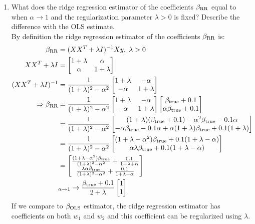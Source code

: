 \documentclass[12pt,twoside]{article}
\begin{document}
\begin{enumerate}
\begin{enumerate}
  \item What does the ridge regression estimator of the coefficients $\beta_{\operatorname{RR}}$ equal to when $\alpha \rightarrow 1$ and the regularization parameter $\lambda >0$ is fixed? Describe the difference with the OLS estimate.\\
 
  \medskip
  By definition the ridge regression estimator of the coefficients $\beta_{\operatorname{RR}}$ is:
 \begin{align*}
 	\beta_{\operatorname{RR}}				&=	(X X^T + \lambda I)^{-1}	X y	, \; \lambda > 0	\\
	X X^T + \lambda I			&=	\begin{bmatrix} 1+ \lambda & \alpha \\ \alpha  &1+ \lambda \end{bmatrix} \\
	(X X^T + \lambda I)^{-1}		&=	\frac{1}{(1 + \lambda)^2 - \alpha^2} \begin{bmatrix} 1+ \lambda & -\alpha \\ -\alpha & 1+ \lambda \end{bmatrix} \\	
	\Rightarrow \beta_{\operatorname{RR}}	&=	\frac{1}{(1 + \lambda)^2 - \alpha^2} \begin{bmatrix} 1+ \lambda & -\alpha \\ -\alpha & 1+ \lambda \end{bmatrix} \begin{bmatrix} \beta_{\operatorname{true}} + 0.1 \\ \alpha \beta_{\operatorname{true}} + 0.1 \end{bmatrix} \\
							&=	\frac{1}{(1 + \lambda)^2 - \alpha^2}  \begin{bmatrix} (1+ \lambda) (\beta_{\operatorname{true}} + 0.1) -\alpha^2  \beta_{\operatorname{true}} -0.1 \alpha \\
																-\alpha \beta_{\operatorname{true}}  -0.1 \alpha + \alpha (1+\lambda) \beta_{\operatorname{true}}  + 0.1 (1 + \lambda)  \end{bmatrix} \\
							&=	\frac{1}{(1 + \lambda)^2 - \alpha^2}  \begin{bmatrix} (1+ \lambda  -\alpha^2) \beta_{\operatorname{true}}  + 0.1 (1+ \lambda  -\alpha) \\ 			
																\alpha \lambda \beta_{\operatorname{true}} + 0.1 (1+ \lambda  -\alpha) \end{bmatrix} \\
							&=	 \begin{bmatrix} \frac{(1+ \lambda  -\alpha^2) \beta_{\operatorname{true}}} {(1 + \lambda)^2 - \alpha^2} + \frac{0.1} {1 + \lambda + \alpha} \\
									\frac{ \lambda \alpha  \beta_{\operatorname{true}}} {(1 + \lambda)^2 - \alpha^2} + \frac{0.1} {1 + \lambda + \alpha}  \end{bmatrix} \\
							&_{\alpha \rightarrow 1}\rightarrow \frac{ \beta_{\operatorname{true}} + 0.1}{ 2 + \lambda} \begin{bmatrix} 1  \\ 1 \end{bmatrix} 
 \end{align*} 
If we compare to $\beta_{\operatorname{OLS}}$ estimator,  the ridge regression estimator has coefficients on both $w_1$ and $w_2$ and this coefficient can be regularized using $\lambda$. 

\end{enumerate}
\end{enumerate}
\end{document}
